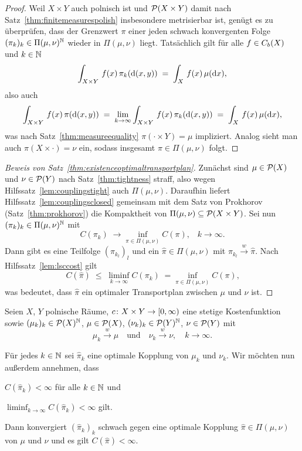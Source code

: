 \documentclass[../main/main.tex]{subfiles}
\begin{document}
	\begin{proof}
		Weil $X \times Y$ auch polnisch ist und $\mathcal{P}(X \times Y)$ damit nach Satz~\ref{thm:finitemeasurespolish} insbesondere metrisierbar ist, genügt es zu überprüfen, dass der Grenzwert $\pi$ einer jeden schwach konvergenten Folge $(\pi_k)_k \in \Pi(\mu, \nu)^{\mathbb{N}}$ wieder in $\Pi(\mu, \nu)$ liegt. Tatsächlich gilt für alle $f \in C_b(X)$ und $k \in \mathbb{N}$
		\[ \int_{X \times Y} \, f(x) \, \pi_k(\mathrm{d}(x, y)) \; = \; \int_{X} \, f(x) \, \mu(\mathrm{d}x) \text{,} \]
		also auch 
		\[ \int_{X \times Y} \, f(x) \, \pi(\mathrm{d}(x, y)) \; = \; \lim_{k \to \infty} \int_{X \times Y} \, f(x) \, \pi_k(\mathrm{d}(x, y)) \; = \; \int_{X} \, f(x) \, \mu(\mathrm{d}x) \text{,} \]
		was nach Satz~\ref{thm:measureequality} $\pi(\cdot \times Y) = \mu$ impliziert. Analog sieht man auch $\pi(X \times \cdot) = \nu$ ein, sodass insgesamt $\pi \in \Pi(\mu, \nu)$ folgt.
	\end{proof}

	\begin{proof}[Beweis von Satz~\ref{thm:existenceoptimaltransportplan}]
		Zunächst sind $\mu \in \mathcal{P}(X)$ und $\nu \in \mathcal{P}(Y)$ nach Satz~\ref{thm:tightness} straff, also wegen Hilfssatz~\ref{lem:couplingstight} auch 
		$\Pi(\mu, \nu)$. Daraufhin liefert Hilfssatz~\ref{lem:couplingsclosed} gemeinsam mit dem Satz von Prokhorov (Satz~\ref{thm:prokhorov}) die Kompaktheit von $\Pi(\mu, \nu) \subseteq \mathcal{P}(X \times Y)$.
		Sei nun $(\pi_k)_k \in \Pi(\mu, \nu)^{\mathbb{N}}$ mit
		\[ C(\pi_k) \; \to \inf_{\pi \in \Pi(\mu, \nu)} C(\pi) \text{,} \quad k \to \infty \text{.} \]
		Dann gibt es eine Teilfolge $(\pi_{k_l})_l$ und ein $\hat{\pi} \in \Pi(\mu, \nu)$ mit $\pi_{k_l} \xrightarrow{w} \hat{\pi}$. Nach Hilfssatz~\ref{lem:lsccost} gilt
		\[ C(\hat{\pi}) \; \leq \; \liminf_{k \to \infty} C(\pi_k) \; = \inf_{\pi \in \Pi(\mu, \nu)} C(\pi) \text{,} \]
		was bedeutet, dass $\hat{\pi}$ ein optimaler Transportplan zwischen $\mu$ und $\nu$ ist. 
	\end{proof}

	\begin{Satz}
		\label{thm:optimalseqremainsoptimal}
		Seien $X$, $Y$ polnische Räume, $c \colon X \times Y \to [0, \infty)$ eine stetige Kostenfunktion sowie $(\mu_k)_k \in \mathcal{P}(X)^{\mathbb{N}}$, $\mu \in \mathcal{P}(X)$, 
		$(\nu_k)_k \in \mathcal{P}(Y)^{\mathbb{N}}$, $\nu \in \mathcal{P}(Y)$ mit
		\[ \mu_k \xrightarrow{w} \mu \quad \text{und} \quad \nu_k \xrightarrow{w} \nu, \quad k \to \infty \text{.} \]
		
		Für jedes $k \in \mathbb{N}$ sei $\hat{\pi}_k$ eine optimale Kopplung von $\mu_k$ und $\nu_k$. 
		Wir möchten nun außerdem annehmen, dass
		\begin{itemizethm}
			\item $C(\hat{\pi}_k) < \infty$ für alle $k \in \mathbb{N}$ und
			\item $\liminf_{k \to \infty} C(\hat{\pi}_k) < \infty$ gilt.
		\end{itemizethm}
		Dann konvergiert $(\hat{\pi}_k)_k$ schwach gegen eine optimale Kopplung $\hat{\pi} \in \Pi(\mu, \nu)$ von $\mu$ und $\nu$ und es gilt $C(\hat{\pi}) < \infty$. 
	\end{Satz}
\end{document}

